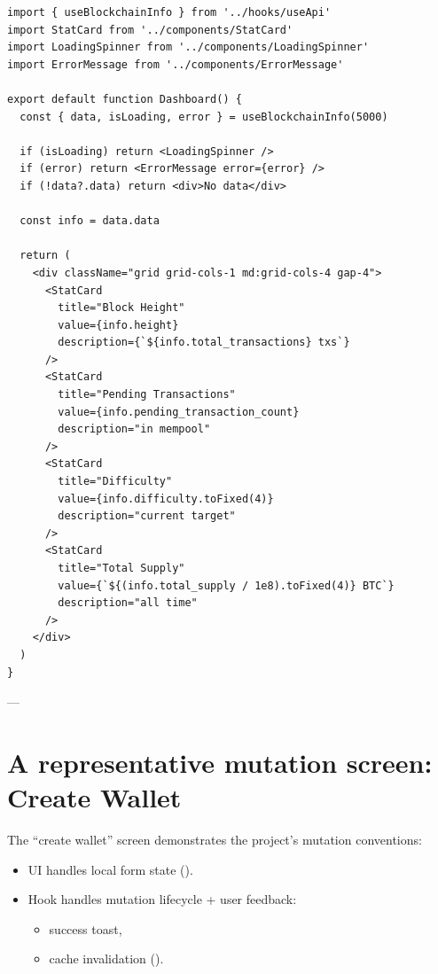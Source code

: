 \begin{listing}[htbp]
\caption{Dashboard --- the standard query pattern}
\label{lst:ch21-dashboard}
\begin{verbatim}
import { useBlockchainInfo } from '../hooks/useApi'
import StatCard from '../components/StatCard'
import LoadingSpinner from '../components/LoadingSpinner'
import ErrorMessage from '../components/ErrorMessage'

export default function Dashboard() {
  const { data, isLoading, error } = useBlockchainInfo(5000)

  if (isLoading) return <LoadingSpinner />
  if (error) return <ErrorMessage error={error} />
  if (!data?.data) return <div>No data</div>

  const info = data.data

  return (
    <div className="grid grid-cols-1 md:grid-cols-4 gap-4">
      <StatCard
        title="Block Height"
        value={info.height}
        description={`${info.total_transactions} txs`}
      />
      <StatCard
        title="Pending Transactions"
        value={info.pending_transaction_count}
        description="in mempool"
      />
      <StatCard
        title="Difficulty"
        value={info.difficulty.toFixed(4)}
        description="current target"
      />
      <StatCard
        title="Total Supply"
        value={`${(info.total_supply / 1e8).toFixed(4)} BTC`}
        description="all time"
      />
    </div>
  )
}
\end{verbatim}
\end{listing}

---

\section{A representative mutation screen: Create Wallet}
\label{sec:create-wallet-screen}

The ``create wallet'' screen demonstrates the project's mutation conventions:

\begin{itemize}
  \item UI handles local form state ().
  \item Hook handles mutation lifecycle + user feedback:
    \begin{itemize}
      \item success toast,
      \item cache invalidation ().
    \end{itemize}
\end{itemize}

